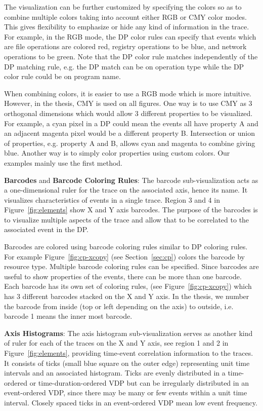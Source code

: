 The visualization can be further customized by specifying the colors so
as to combine multiple colors taking
into account either RGB or CMY color modes.
This gives flexibility to emphasize or hide any kind of information
in the trace.
For example, in the RGB mode, the DP color rules
can specify that events which are
file operations are colored red,
registry operations to be blue, and network operations to be green.
Note that the DP color rule matches independently of the DP matching rule,
e.g. the DP match can be on operation type while the DP color rule could be
on program name.

When combining colors, it is easier to use a RGB mode which is
more intuitive. However, in the thesis, CMY is used on all figures.
One way is to use CMY as 3 orthogonal dimensions which would allow 3 different
properties to be visualized.
For example, a cyan pixel in a DP could mean
the events all have property A and an adjacent magenta pixel
would be a different property B.
Intersection or union of properties, e.g. property A and B,
allows cyan and magenta to combine giving blue.
Another way is to simply color properties using custom colors.
Our examples mainly use the first method.

{\bf Barcodes} and {\bf Barcode Coloring Rules}:
The barcode sub-visualization acts as a one-dimensional ruler for the trace on
the associated axis, hence its name.
It visualizes characteristics of events in a single trace.
Region 3 and 4 in Figure~\ref{fig:elements} show X and Y axis barcodes.
The purpose of the barcodes is to visualize multiple aspects of
the trace and allow that to be correlated to the associated event in the DP.

Barcodes are colored using
barcode coloring rules similar to DP coloring rules.
For example Figure~\ref{fig:cp-xcopy} (see Section~\ref{sec:cp})
colors the barcode by resource type.
Multiple barcode coloring rules can be specified.
Since barcodes are useful to show properties of the events,
there can be more than one barcode. Each barcode has its own
set of coloring rules, (see Figure~\ref{fig:cp-xcopy}) which has 3 different
barcodes stacked on the X and Y axis.
In the thesis, we number the barcode from inside (top or left depending
on the axis) to outside, i.e. barcode 1 means the inner most barcode.

{\bf Axis Histograms}:
The axis histogram sub-visualization
serves as another kind of ruler for each of the traces on the X and Y axis,
see region 1 and 2 in Figure~\ref{fig:elements}, providing
time-event correlation information to the traces.
It consists of
ticks (small blue square on the outer edge) representing unit time intervals
and an associated histogram.
Ticks are evenly distributed in a time-ordered or time-duration-ordered VDP
but can be irregularly distributed in an event-ordered VDP,
since there may be many or few events within a unit time interval.
Closely spaced ticks in an event-ordered VDP mean low event frequency.

